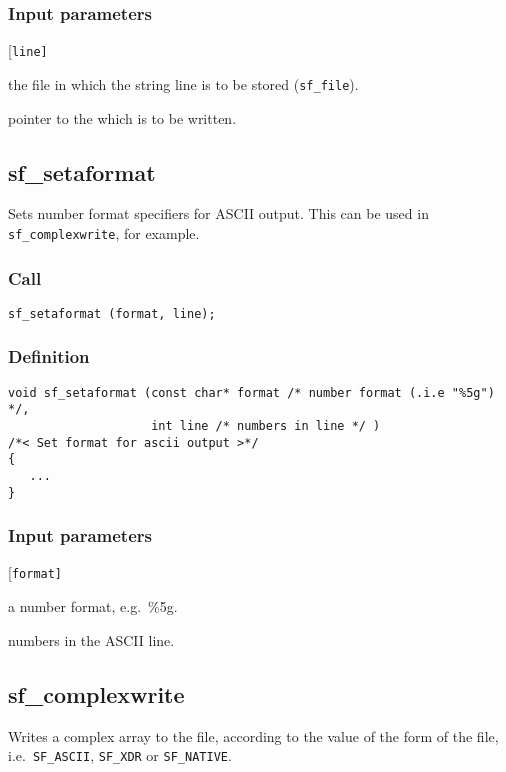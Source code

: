 \subsubsection*{Input parameters}
\begin{desclist}{\tt }{\quad}[\tt line]
   \setlength\itemsep{0pt}
   \item[file] the file in which the string line is to be stored (\texttt{sf\_file}). 
   \item[line] pointer to the which is to be written. 
\end{desclist}




\subsection{{sf\_setaformat}}
Sets number format specifiers for ASCII output. This can be used in \texttt{sf\_complexwrite}, for example.  

\subsubsection*{Call}
\begin{verbatim}sf_setaformat (format, line);\end{verbatim}

\subsubsection*{Definition}
\begin{verbatim}
void sf_setaformat (const char* format /* number format (.i.e "%5g") */, 
                    int line /* numbers in line */ )
/*< Set format for ascii output >*/
{
   ...    
}
\end{verbatim}

\subsubsection*{Input parameters}
\begin{desclist}{\tt }{\quad}[\tt format]
   \setlength\itemsep{0pt}
   \item[format] a number format, e.g.~\%5g. 
   \item[line]   numbers in the ASCII line.
\end{desclist}




\subsection{{sf\_complexwrite}}
Writes a complex array to the file, according to the value of the form of the file, i.e.~\texttt{SF\_ASCII}, \texttt{SF\_XDR} or \texttt{SF\_NATIVE}.    


